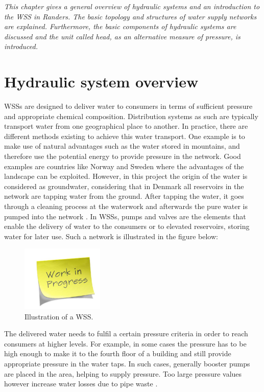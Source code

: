 \emph{This chapter gives a general overview of hydraulic systems and an introduction to the WSS in Randers. The basic topology and structures of water supply networks are explained. Furthermore, the basic components of hydraulic systems are discussed and the unit called head, as an alternative measure of pressure, is introduced.}

\section{Hydraulic system overview}
\label{hydraulic_system_overview}

WSSs are designed to deliver water to consumers in terms of sufficient pressure and appropriate chemical composition. Distribution systems as such are typically transport water from one geographical place to another. In practice, there are different methods existing to achieve this water transport. One example is to make use of natural advantages such as the water stored in mountains, and therefore use the potential energy to provide pressure in the network. Good examples are countries like Norway and Sweden where the advantages of the landscape can be exploited. However, in this project the origin of the water is considered as groundwater, considering that in Denmark all reservoirs in the network are tapping water from the ground. After tapping the water, it goes through a cleaning process at the waterwork and afterwards the pure water is pumped into the network \cite{prahata}. In WSSs, pumps and valves are the elements that enable the delivery of water to the consumers or to elevated reservoirs, storing water for later use. Such a network is illustrated in the figure below: 

\begin{figure}[H]
\centering
\includegraphics[width=0.35\textwidth]{report/pictures/missingfigure}
\caption{Illustration of a WSS.}
\label{fig:WSS_example}
\end{figure}

The delivered water needs to fulfil a certain pressure criteria in order to reach consumers at higher levels. For example, in some cases the pressure has to be high enough to make it to the fourth floor of a building and still provide appropriate pressure in the water taps. In such cases, generally booster pumps are placed in the area, helping to supply pressure. Too large pressure values however  increase water losses due to pipe waste \cite{walski2003advanced}.

